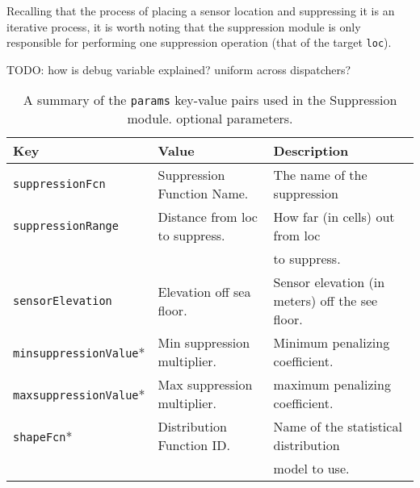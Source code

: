 Recalling that the process of placing a sensor location and suppressing it is an iterative process, it is worth noting that the suppression module is only responsible for performing one suppression operation (that of the target \texttt{loc}).  



TODO: how is debug variable explained?  uniform across dispatchers?

\begin{table}[ht]
	\begin{tabular}{l l l}
		Key									&	Value 							&	Description\\
		\hline
		\texttt{suppressionFcn}				& 	Suppression Function Name.		&	The name of the suppression \\

		\texttt{suppressionRange}			&	Distance from loc to suppress.	&	How far (in cells) out from loc\\
											&									&   to suppress.\\
		\texttt{sensorElevation}			& 	Elevation off sea floor.		&   Sensor elevation (in meters) off the see floor.\\
		\texttt{minsuppressionValue}*		& 	Min suppression multiplier.		&	Minimum penalizing coefficient.\\
		\texttt{maxsuppressionValue}*		& 	Max suppression multiplier.		&	maximum penalizing coefficient.\\
		\texttt{shapeFcn}*					&   Distribution Function ID. 		&   Name of the statistical distribution\\
											&									&   model to use.\\
	\end{tabular}
	\caption{A summary of the \texttt{params} key-value pairs used in the Suppression module.  \newline * optional parameters.
		\label{animalParams}}
\end{table}

